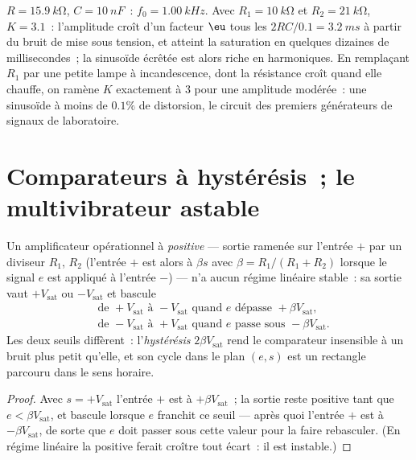 \begin{example}\label{ex:b2:feedback-oscillators:wiennumbers}
$R = \qty{15.9}{k\ohm}$, $C = \qty{10}{nF}$~: $f_0 = \qty{1.00}{kHz}$. Avec $R_1 =
\qty{10}{k\ohm}$ et $R_2 = \qty{21}{k\ohm}$, $K = 3.1$~: l'amplitude croît d'un facteur
$\eu$ tous les $2RC/0.1 = \qty{3.2}{ms}$ à partir du bruit de mise sous tension, et atteint
la saturation en quelques dizaines de millisecondes~; la sinusoïde écrêtée est alors
riche en harmoniques. En remplaçant $R_1$ par une petite lampe à incandescence, dont la
résistance croît quand elle chauffe, on ramène $K$ exactement à $3$ pour une
amplitude modérée~: une sinusoïde à moins de $0.1\%$ de distorsion,
le circuit des premiers générateurs de signaux de laboratoire.
\end{example}

\section{Comparateurs à hystérésis~; le multivibrateur astable}

\begin{proposition}\label{prop:b2:feedback-oscillators:schmitt}
Un amplificateur opérationnel à  \emph{positive} --- sortie ramenée sur l'entrée $+$
par un diviseur $R_1$, $R_2$ (l'entrée $+$ est alors à $\beta s$ avec
$\beta = R_1/(R_1 + R_2)$ lorsque le signal $e$ est appliqué à l'entrée $-$)
--- n'a aucun régime linéaire stable~: sa sortie vaut $+V_{\text{sat}}$ ou
$-V_{\text{sat}}$ et bascule
\begin{align*}
&\text{de } +V_{\text{sat}} \text{ à } -V_{\text{sat}} \text{ quand } e \text{ dépasse } +\beta V_{\text{sat}} ,\\
&\text{de } -V_{\text{sat}} \text{ à } +V_{\text{sat}} \text{ quand } e \text{ passe sous } -\beta V_{\text{sat}} .
\end{align*}
Les deux seuils diffèrent~: l'\emph{hystérésis} $2\beta V_{\text{sat}}$ rend
le comparateur insensible à un bruit plus petit qu'elle, et son cycle dans
le plan $(e, s)$ est un rectangle parcouru dans le sens horaire.
\end{proposition}

\begin{proof}
Avec $s = +V_{\text{sat}}$ l'entrée $+$ est à $+\beta V_{\text{sat}}$~; la sortie
reste positive tant que $e < \beta V_{\text{sat}}$, et bascule lorsque $e$ franchit
ce seuil --- après quoi l'entrée $+$ est à $-\beta V_{\text{sat}}$, de sorte que $e$ doit
passer sous cette valeur pour la faire rebasculer. (En régime linéaire la 
positive ferait croître tout écart~: il est instable.)
\end{proof}

